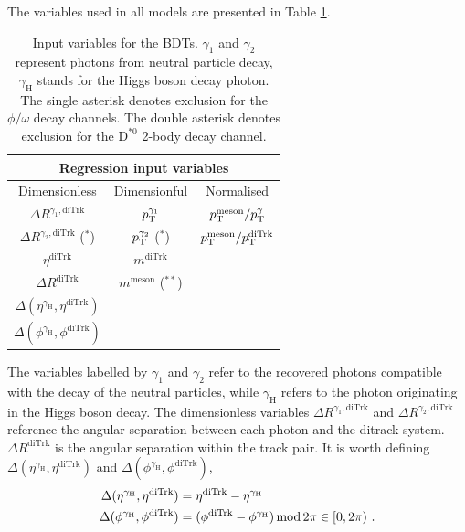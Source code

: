 The variables used in all models are presented in Table \ref{tab:model_variables}.
\begin{table}[!ht]
    \centering
    \begin{tabular}{|c|c|c|}
        \hline
        \multicolumn{3}{|c|}{\cellcolor{lightgray} Regression input variables} \\ \hline
        \cellcolor{lightgray}Dimensionless  &\cellcolor{lightgray}Dimensionful  &\cellcolor{lightgray}Normalised            \\\hline
        $\Delta R^{\gamma_1, \text{diTrk}}$             &$p_\text{T}^{\gamma_1}$           &$p_\text{T}^{\text{meson}}/p_\text{T}^{\gamma}$          \\
        $\Delta R^{\gamma_2, \text{diTrk}}$ ($^{*}$)   &$p_\text{T}^{\gamma_2}$ ($^{*}$) &$p_\text{T}^{\text{meson}}/p_\text{T}^{\text{diTrk}}$    \\
        $\eta^{\text{diTrk}}$                           &$m^{\text{diTrk}}$         &       \\
        $\Delta R^{\text{diTrk}}$                       &$m^{\text{meson}}$ ($^{**}$)  &       \\
        $\Delta(\eta^{\gamma_{\text{H}}}, \eta^{\text{diTrk}})$    & & \\
        $\Delta(\phi^{\gamma_{\text{H}}}, \phi^{\text{diTrk}})$    & & \\
        \hline
    \end{tabular}
    \caption{Input variables for the BDTs. $\gamma_1$ and $\gamma_2$ represent photons from neutral particle decay, $\gamma_{\text{H}}$ stands for the Higgs boson decay photon. The single asterisk denotes exclusion for the $\phi/\omega$ decay channels. The double asterisk denotes exclusion for the $\text{D}^{*0}$ 2-body decay channel.}
    \label{tab:model_variables}
\end{table}
The variables labelled by $\gamma_1$ and $\gamma_2$ refer to the recovered photons compatible with the decay of the neutral particles, while $\gamma_{\text{H}}$ refers to the photon originating in the Higgs boson decay. The dimensionless variables $\Delta R^{\gamma_1, \text{diTrk}}$ and $\Delta R^{\gamma_2, \text{diTrk}}$ reference the angular separation between each photon and the ditrack system. $\Delta R^{\text{diTrk}}$ is the angular separation within the track pair. It is worth defining $\Delta(\eta^{\gamma_{\text{H}}}, \eta^{\text{diTrk}})$ and $\Delta(\phi^{\gamma_{\text{H}}}, \phi^{\text{diTrk}})$,
\begin{equation*}
    \begin{aligned}
    \Delta(\eta^{\gamma_{\text{H}}}, \eta^{\text{diTrk}}) &= \eta^{\text{diTrk}} - \eta^{\gamma_{\text{H}}} \\
    \Delta(\phi^{\gamma_{\text{H}}}, \phi^{\text{diTrk}}) &= (\phi^{\text{diTrk}} - \phi^{\gamma_{\text{H}}}) \operatorname{mod} 2\pi \in[0, 2\pi)\ .
    \end{aligned}
\end{equation*}
